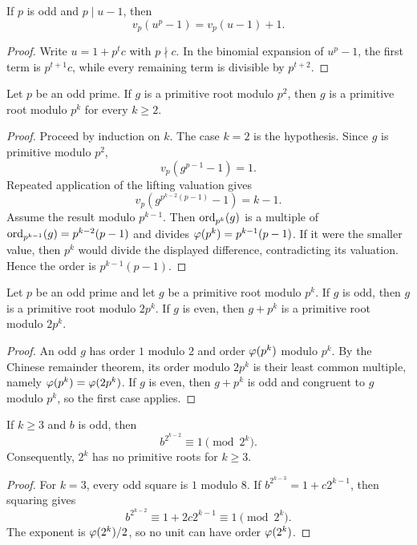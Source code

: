 \begin{lem}
If $p$ is odd and $p\mid u-1$, then
\[
 v_p(u^p-1)=v_p(u-1)+1.
\]
\end{lem}
\begin{proof}
Write $u=1+p^t c$ with $p\nmid c$.  In the binomial expansion of $u^p-1$, the first term is $p^{t+1}c$, while every remaining term is divisible by $p^{t+2}$.
\end{proof}

\begin{thm}
Let $p$ be an odd prime.  If $g$ is a primitive root modulo $p^2$, then $g$ is a primitive root modulo $p^k$ for every $k\ge2$.
\end{thm}
\begin{proof}
Proceed by induction on $k$.  The case $k=2$ is the hypothesis.  Since $g$ is primitive modulo $p^2$,
\[
 v_p(g^{p-1}-1)=1.
\]
Repeated application of the lifting valuation gives
\[
 v_p\left(g^{p^{k-2}(p-1)}-1\right)=k-1.
\]
Assume the result modulo $p^{k-1}$.  Then $\operatorname{ord}_{p^k}(g)$ is a multiple of
$\operatorname{ord}_{p^{k-1}}(g)=p^{k-2}(p-1)$ and divides
$\varphi(p^k)=p^{k-1}(p-1)$.  If it were the smaller value, then $p^k$ would divide the displayed difference, contradicting its valuation.  Hence the order is $p^{k-1}(p-1)$.
\end{proof}

\begin{thm}
Let $p$ be an odd prime and let $g$ be a primitive root modulo $p^k$.  If $g$ is odd, then $g$ is a primitive root modulo $2p^k$.  If $g$ is even, then $g+p^k$ is a primitive root modulo $2p^k$.
\end{thm}
\begin{proof}
An odd $g$ has order $1$ modulo $2$ and order $\varphi(p^k)$ modulo $p^k$.  By the Chinese remainder theorem, its order modulo $2p^k$ is their least common multiple, namely
$\varphi(p^k)=\varphi(2p^k)$.  If $g$ is even, then $g+p^k$ is odd and congruent to $g$ modulo $p^k$, so the first case applies.
\end{proof}

\begin{thm}
If $k\ge3$ and $b$ is odd, then
\[
 b^{2^{k-2}}\equiv1\pmod{2^k}.
\]
Consequently, $2^k$ has no primitive roots for $k\ge3$.
\end{thm}
\begin{proof}
For $k=3$, every odd square is $1$ modulo $8$.  If
$b^{2^{k-3}}=1+c2^{k-1}$, then squaring gives
\[
 b^{2^{k-2}}\equiv1+2c2^{k-1}\equiv1\pmod{2^k}.
\]
The exponent is $\varphi(2^k)/2$, so no unit can have order $\varphi(2^k)$.
\end{proof}

